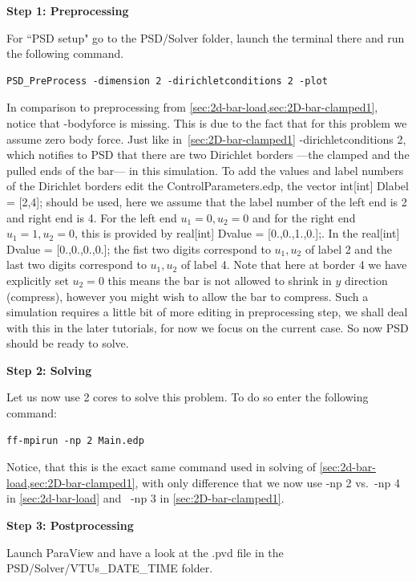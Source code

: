 \documentclass{report}
\begin{document}
\textbf{Step 1: Preprocessing}

For ``PSD setup" go to the {\ttfamily PSD/Solver} folder, launch the terminal there and run the following command.
\begin{lstlisting}[style=Linux]
PSD_PreProcess -dimension 2 -dirichletconditions 2 -plot
\end{lstlisting}
%
In comparison to preprocessing from \cref{sec:2d-bar-load,sec:2D-bar-clamped1}, notice that {\ttfamily -bodyforce} is missing. This is due to the fact that for this problem we assume zero body force. Just like in~\cref{sec:2D-bar-clamped1} {\ttfamily -dirichletconditions 2}, which notifies to PSD that there are two Dirichlet borders ---the clamped and the pulled ends of the bar--- in this simulation. To add the values and label numbers of the Dirichlet borders edit the  {\ttfamily ControlParameters.edp},  the vector {\ttfamily int[int] Dlabel = [2,4];} should be used, here we assume that the label number of the left end is 2 and right end is 4. For the left end $u_1=0,u_2=0$ and for the right end $u_1=1,u_2=0$, this is provided by {\ttfamily real[int]   Dvalue = [0.,0.,1.,0.];}. In the  {\ttfamily real[int]   Dvalue = [0.,0.,0.,0.];} the fist two digits correspond to $u_1,u_2$ of label 2 and the last two digits correspond to $u_1,u_2$ of label 4. Note that here at border 4 we have explicitly set $u_2=0$ this means the bar is not allowed to shrink in $y$ direction (compress), however you might wish to allow the bar to compress. Such a simulation requires a little bit of more editing in preprocessing step, we shall deal with this in the later tutorials, for now we focus on the current case. So now PSD should be ready to solve. 

\textbf{Step 2: Solving}

Let us now use 2 cores to solve this problem. To do so enter the following command:

\begin{lstlisting}[style=Linux]
ff-mpirun -np 2 Main.edp
\end{lstlisting}
%
Notice, that this is the exact same command used in solving of \cref{sec:2d-bar-load,sec:2D-bar-clamped1}, with only difference that we now use {\ttfamily -np 2} vs.~{\ttfamily -np 4} in \cref{sec:2d-bar-load} and ~{\ttfamily -np 3} in \cref{sec:2D-bar-clamped1}.


\textbf{Step 3: Postprocessing}

Launch ParaView and have a look at the  {\ttfamily .pvd} file in the  {\ttfamily PSD/Solver/VTUs\_DATE\_TIME} folder. 
\end{document}
